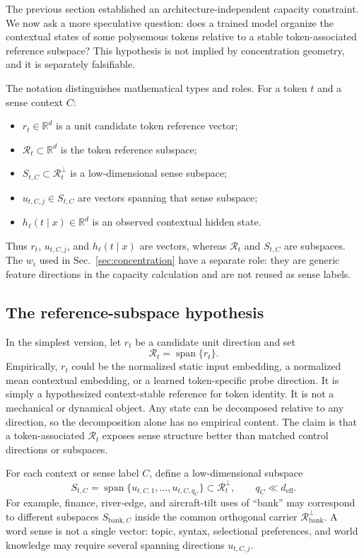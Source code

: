 \documentclass[
  aps,
  reprint,
  superscriptaddress,
  floatfix,
  nofootinbib,
  longbibliography
]{revtex4-2}
\newcommand{\R}{\mathbb{R}}
\newcommand{\deff}{d_{\mathrm{eff}}}
\DeclareMathOperator{\spanop}{span}
\begin{document}
The previous section established an architecture-independent capacity
constraint. We now ask a more speculative question: does a trained model
organize the contextual states of some polysemous tokens relative to a
stable token-associated reference subspace? This hypothesis is not implied
by concentration geometry, and it is separately falsifiable.

The notation distinguishes mathematical types and roles. For a token $t$
and a sense context $C$:
%
\begin{itemize}
\item $r_t\in\R^d$ is a unit candidate token reference vector;
\item $\mathcal R_t\subset\R^d$ is the token reference subspace;
\item $S_{t,C}\subset\mathcal R_t^\perp$ is a low-dimensional sense
subspace;
\item $u_{t,C,j}\in S_{t,C}$ are vectors spanning that sense subspace;
\item $h_\ell(t\mid x)\in\R^d$ is an observed contextual hidden state.
\end{itemize}
%
Thus $r_t$, $u_{t,C,j}$, and $h_\ell(t\mid x)$ are vectors, whereas
$\mathcal R_t$ and $S_{t,C}$ are subspaces. The $w_i$ used in
Sec.~\ref{sec:concentration} have a separate role: they are generic feature
directions in the capacity calculation and are not reused as sense labels.

\subsection{The reference-subspace hypothesis}
\label{sec:reference-hypothesis}

In the simplest version, let $r_t$ be a candidate unit direction and set
%
\begin{equation}
\label{eq:reference-direction}
\mathcal R_t=\spanop\{r_t\}.
\end{equation}
%
Empirically, $r_t$ could be the normalized static input embedding, a
normalized mean contextual embedding, or a learned token-specific probe
direction. It is simply a hypothesized context-stable reference for token
identity. It is not a mechanical or dynamical object.
Any state can be decomposed relative to any direction, so the decomposition
alone has no empirical content. The claim is that a token-associated
$\mathcal R_t$ exposes sense structure better than matched control
directions or subspaces.

For each context or sense label $C$, define a low-dimensional subspace
%
\begin{equation}
\label{eq:sense-subspace}
S_{t,C}=\spanop\{u_{t,C,1},\dots,u_{t,C,q_C}\}
\subset\mathcal R_t^\perp,
\qquad q_C\ll\deff .
\end{equation}
%
For example, finance, river-edge, and aircraft-tilt uses of ``bank'' may
correspond to different subspaces $S_{\mathrm{bank},C}$ inside the common
orthogonal carrier $\mathcal R_{\mathrm{bank}}^\perp$. A word sense is not
a single vector: topic, syntax, selectional preferences, and world knowledge
may require several spanning directions $u_{t,C,j}$.
\end{document}
